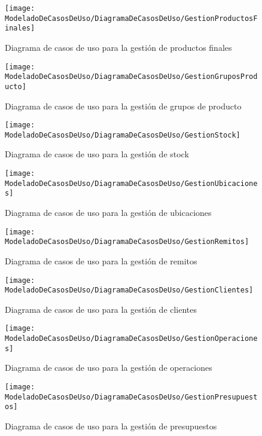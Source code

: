     \begin{figure}[H]
		\centering
		\texttt{[image: ModeladoDeCasosDeUso/DiagramaDeCasosDeUso/GestionProductosFinales]}
		\caption{Diagrama de casos de uso para la gestión de productos finales}
	\label{fig:GestionProductosFinales}
    \end{figure}
    \begin{figure}[H]
		\centering
		\texttt{[image: ModeladoDeCasosDeUso/DiagramaDeCasosDeUso/GestionGruposProducto]}
		\caption{Diagrama de casos de uso para la gestión de grupos de producto}
	\label{fig:GestionGruposProducto}
	\end{figure}
	\begin{figure}[H]
		\centering
		\texttt{[image: ModeladoDeCasosDeUso/DiagramaDeCasosDeUso/GestionStock]}
		\caption{Diagrama de casos de uso para la gestión de stock}
	\label{fig:GestionStock}
	\end{figure}
	\begin{figure}[H]
		\centering
		\texttt{[image: ModeladoDeCasosDeUso/DiagramaDeCasosDeUso/GestionUbicaciones]}
		\caption{Diagrama de casos de uso para la gestión de ubicaciones}
	\label{fig:GestionUbicaciones}
    \end{figure}
	\begin{figure}[H]
		\centering
		\texttt{[image: ModeladoDeCasosDeUso/DiagramaDeCasosDeUso/GestionRemitos]}
		\caption{Diagrama de casos de uso para la gestión de remitos}
	\label{fig:GestionRemitos}
    \end{figure}
    \begin{figure}[H]
		\centering
		\texttt{[image: ModeladoDeCasosDeUso/DiagramaDeCasosDeUso/GestionClientes]}
		\caption{Diagrama de casos de uso para la gestión de clientes}
	\label{fig:GestionClientes}
	\end{figure}
	\begin{figure}[H]
		\centering
		\texttt{[image: ModeladoDeCasosDeUso/DiagramaDeCasosDeUso/GestionOperaciones]}
		\caption{Diagrama de casos de uso para la gestión de operaciones}
	\label{fig:GestionOperaciones}
	\end{figure}
    \begin{figure}[H]
		\centering
		\texttt{[image: ModeladoDeCasosDeUso/DiagramaDeCasosDeUso/GestionPresupuestos]}
		\caption{Diagrama de casos de uso para la gestión de presupuestos}
	\label{fig:GestionPresupuestos}
    \end{figure}
